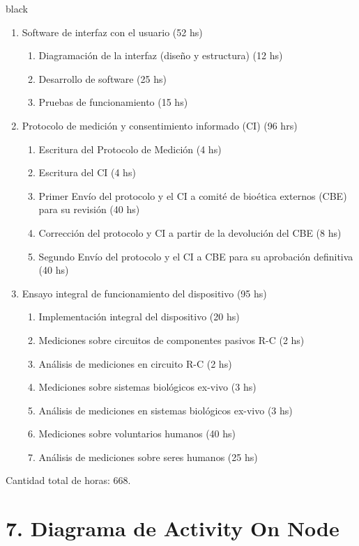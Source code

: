 \documentclass[11pt]{charter}
\begin{document}
\begin{consigna}{black}
\begin{enumerate}
\item Software de interfaz con el usuario (52 hs) 
	\begin{enumerate}
	\item Diagramación de la interfaz (diseño y estructura) (12 hs)
	\item Desarrollo de software (25 hs)
	\item Pruebas de funcionamiento (15 hs)
	\end{enumerate}

\item Protocolo de medición y consentimiento informado (CI) (96 hrs)
	\begin{enumerate}
	\item Escritura del Protocolo de Medición (4 hs)
	\item Escritura del CI (4 hs)
	\item Primer Envío del protocolo y el CI a comité de bioética externos (CBE) para su revisión (40 hs)
	\item Corrección del protocolo y CI a partir de la devolución del CBE (8 hs)
	\item Segundo Envío del protocolo y el CI a CBE para su aprobación definitiva (40 hs)
	\end{enumerate}

\item Ensayo integral de funcionamiento del dispositivo (95 hs)
	\begin{enumerate}
	\item Implementación integral del dispositivo (20 hs)
	\item Mediciones sobre circuitos de componentes pasivos R-C (2 hs)
	\item Análisis de mediciones en circuito R-C (2 hs)
	\item Mediciones sobre sistemas biológicos ex-vivo (3 hs)
	\item Análisis de mediciones en sistemas biológicos ex-vivo (3 hs)
	\item Mediciones sobre voluntarios humanos (40 hs)
	\item Análisis de mediciones sobre seres humanos (25 hs)
	\end{enumerate}
	
\end{enumerate}

Cantidad total de horas: 668.

\end{consigna}

\pagebreak

\section{7. Diagrama de Activity On Node}
\label{sec:AoN}
\end{document}
